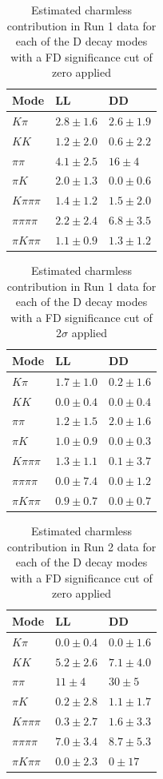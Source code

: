 \begin{table}[h] 
\centering 
\begin{tabular}{lll} 
\hline 
Mode & LL & DD \\ 
\hline 
$K\pi$ & $2.8 \pm 1.6$ & $2.6 \pm 1.9$ \\ 
$KK$ & $1.2 \pm 2.0$ & $0.6 \pm 2.2$ \\ 
$\pi\pi$ & $4.1 \pm 2.5$ & $16 \pm 4$ \\ 
$\pi K$ & $2.0 \pm 1.3$ & $0.0 \pm 0.6$ \\ 
$K\pi\pi\pi$ & $1.4 \pm 1.2$ & $1.5 \pm 2.0$ \\ 
$\pi\pi\pi\pi$ & $2.2 \pm 2.4$ & $6.8 \pm 3.5$ \\ 
$\pi K \pi\pi$ & $1.1 \pm 0.9$ & $1.3 \pm 1.2$ \\ 
\hline 
\end{tabular}
\caption{Estimated charmless contribution in Run 1 data for each of the D decay modes with a FD significance cut of zero applied} 
\label{charmlessyieldsnofd} 
\end{table}

\begin{table}[h]
\centering
\begin{tabular}{lll} 
\hline 
Mode & LL & DD \\ 
\hline 
$K\pi$ & $1.7 \pm 1.0$ & $0.2 \pm 1.6$ \\ 
$KK$ & $0.0 \pm 0.4$ & $0.0 \pm 0.4$ \\ 
$\pi\pi$ & $1.2 \pm 1.5$ & $2.0 \pm 1.6$ \\ 
$\pi K$ & $1.0 \pm 0.9$ & $0.0 \pm 0.3$ \\ 
$K\pi\pi\pi$ & $1.3 \pm 1.1$ & $0.1 \pm 3.7$ \\ 
$\pi\pi\pi\pi$ & $0.0 \pm 7.4$ & $0.0 \pm 1.2$ \\ 
$\pi K \pi\pi$ & $0.9 \pm 0.7$ & $0.0 \pm 0.7$ \\ 
\hline 
\end{tabular}
\caption{Estimated charmless contribution in Run 1 data for each of the D decay modes with a FD significance cut of 2$\sigma$ applied}
\label{charmlessyields}
\end{table}

\begin{table}[h] 
\centering 
\begin{tabular}{lll} 
\hline 
Mode & LL & DD \\ 
\hline 
$K\pi$ & $0.0 \pm 0.4$ & $0.0 \pm 1.6$ \\ 
$KK$ & $5.2 \pm 2.6$ & $7.1 \pm 4.0$ \\ 
$\pi\pi$ & $11 \pm 4$ & $30 \pm 5$ \\ 
$\pi K$ & $0.2 \pm 2.8$ & $1.1 \pm 1.7$ \\ 
$K\pi\pi\pi$ & $0.3 \pm 2.7$ & $1.6 \pm 3.3$ \\ 
$\pi\pi\pi\pi$ & $7.0 \pm 3.4$ & $8.7 \pm 5.3$ \\ 
$\pi K \pi\pi$ & $0.0 \pm 2.3$ & $0 \pm 17$ \\ 
\hline 
\end{tabular} 
\caption{Estimated charmless contribution in Run 2 data for each of the D decay modes with a FD significance cut of zero applied} 
\label{charmlessyieldsnofdRun2} 
\end{table}

